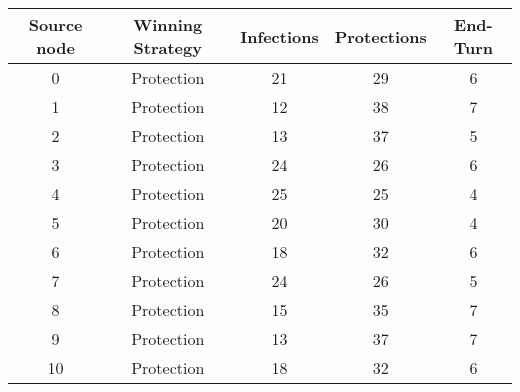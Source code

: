 \documentclass[results.tex]{subfiles}
\begin{document}
    \begin{center}
        \begin{tabular}{| c || c | c | c | c |}
            \hline
            {\bfseries Source node} & {\bfseries Winning Strategy} & {\bfseries Infections} & {\bfseries Protections}
            & {\bfseries End-Turn}
            \\  %
            \hline\hline
            0                       & Protection                   & 21                     & 29                      & 6                    \\
            \hline
            1                       & Protection                   & 12                     & 38                      & 7                    \\
            \hline
            2                       & Protection                   & 13                     & 37                      & 5                    \\
            \hline
            3                       & Protection                   & 24                     & 26                      & 6                    \\
            \hline
            4                       & Protection                   & 25                     & 25                      & 4                    \\
            \hline
            5                       & Protection                   & 20                     & 30                      & 4                    \\
            \hline
            6                       & Protection                   & 18                     & 32                      & 6                    \\
            \hline
            7                       & Protection                   & 24                     & 26                      & 5                    \\
            \hline
            8                       & Protection                   & 15                     & 35                      & 7                    \\
            \hline
            9                       & Protection                   & 13                     & 37                      & 7                    \\
            \hline
            10                      & Protection                   & 18                     & 32                      & 6                    \\

\end{tabular}
\end{center}
\end{document}
